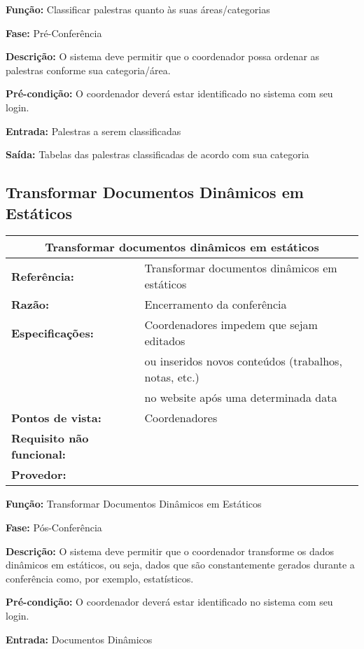 \documentclass[letter]{article}
\begin{document}
\textbf{Função:} Classificar palestras quanto às suas áreas/categorias

\textbf{Fase:}  Pré-Conferência

\textbf{Descrição:}  O sistema deve permitir que o coordenador possa ordenar as palestras conforme sua categoria/área.

\textbf{Pré-condição:}  O coordenador deverá estar identificado no sistema com seu login.

\textbf{Entrada:}  Palestras a serem classificadas

\textbf{Saída:}  Tabelas das palestras classificadas de acordo com sua categoria



\subsection{Transformar Documentos Dinâmicos em Estáticos}



%
\begin{table}[h!]
\begin{center}
\begin{tabular}{|ll|}
\hline 
\multicolumn{2}{|c|}{\textbf{Transformar documentos dinâmicos em estáticos}}\tabularnewline
\hline
\textbf{Referência:} & Transformar documentos dinâmicos em estáticos\tabularnewline
\textbf{Razão:} & Encerramento da conferência\tabularnewline
\textbf{Especificações:} & Coordenadores impedem que sejam editados\tabularnewline
& ou inseridos novos conteúdos (trabalhos, notas, etc.)\tabularnewline
 &  no website após uma determinada data\tabularnewline
\textbf{Pontos de vista:} & Coordenadores\tabularnewline
\textbf{Requisito não funcional:} & \tabularnewline
\textbf{Provedor:} & \tabularnewline
\hline
\end{tabular}
\end{center}
\end{table}

\textbf{Função:} Transformar Documentos Dinâmicos em Estáticos

\textbf{Fase:}  Pós-Conferência

\textbf{Descrição:}  O sistema deve permitir que o coordenador transforme os dados dinâmicos em estáticos, ou seja, dados que são constantemente gerados durante a conferência como, por exemplo, estatísticos.

\textbf{Pré-condição:}  O coordenador deverá estar identificado no sistema com seu login.

\textbf{Entrada:}  Documentos Dinâmicos
\end{document}
